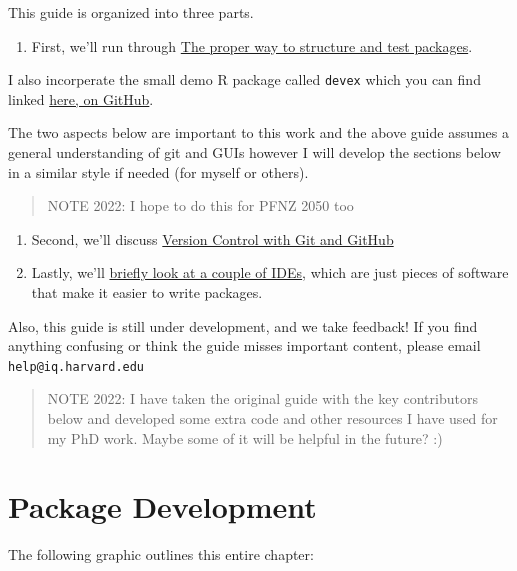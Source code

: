 \documentclass[
]{book}
\providecommand{\tightlist}{%
  \setlength{\itemsep}{0pt}\setlength{\parskip}{0pt}}
\begin{document}
This guide is organized into three parts.

\begin{enumerate}
\def\labelenumi{\arabic{enumi}.}
\tightlist
\item
  First, we'll run through \href{./package-development.html}{The proper way to structure and test packages}.
\end{enumerate}

I also incorperate the small demo R package called \texttt{devex} which you can find linked \href{https://github.com/IQSS/dss-rbuild/tree/master/devex}{here, on GitHub}.

The two aspects below are important to this work and the above guide assumes a general understanding of git and GUIs however I will develop the sections below in a similar style if needed (for myself or others).

\begin{quote}
NOTE 2022: I hope to do this for PFNZ 2050 too
\end{quote}

\begin{enumerate}
\def\labelenumi{\arabic{enumi}.}
\setcounter{enumi}{1}
\item
  Second, we'll discuss \href{./version-control.html}{Version Control with Git and GitHub}
\item
  Lastly, we'll \href{./integrated-development-environments.html}{briefly look at a couple of IDEs}, which are just pieces of software that make it easier to write packages.
\end{enumerate}

Also, this guide is still under development, and we take feedback! If you find anything confusing or think the guide misses important content, please email \texttt{help@iq.harvard.edu}

\begin{quote}
NOTE 2022: I have taken the original guide with the key contributors below and developed some extra code and other resources I have used for my PhD work. Maybe some of it will be helpful in the future? :)
\end{quote}

\hypertarget{package-development}{%
\chapter{Package Development}\label{package-development}}

The following graphic outlines this entire chapter:
\end{document}
